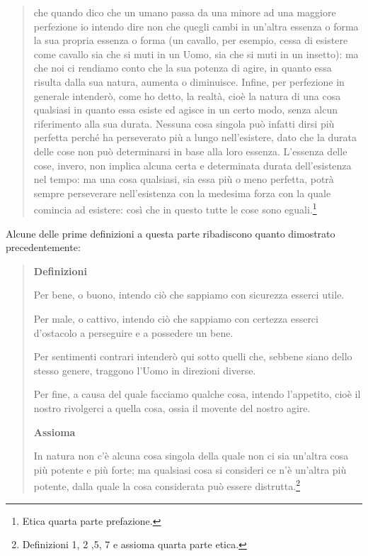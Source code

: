 \begin{quotation}
	che quando dico che un umano passa da una minore ad una maggiore perfezione io intendo dire non che quegli cambi in un’altra essenza o forma la sua propria essenza o forma
	(un cavallo, per esempio, cessa di esistere come cavallo sia che si muti in un Uomo, sia che
	si muti in un insetto): ma che noi ci rendiamo conto che la sua potenza di agire, in quanto
	essa risulta dalla sua natura, aumenta o diminuisce. Infine, per perfezione in generale intenderò, come ho detto, la realtà, cioè la natura di una cosa qualsiasi in quanto essa esiste
	ed agisce in un certo modo, senza alcun riferimento alla sua durata. Nessuna cosa singola
	può infatti dirsi più perfetta perché ha perseverato più a lungo nell’esistere, dato che la durata delle cose non può determinarsi in base alla loro essenza. L’essenza delle cose, invero,
	non implica alcuna certa e determinata durata dell’esistenza nel tempo: ma una cosa qualsiasi, sia essa più o meno perfetta, potrà sempre perseverare nell’esistenza con la medesima forza con la quale comincia ad esistere: così che in questo tutte le cose sono eguali.\footnote{Etica quarta parte prefazione.}
\end{quotation}

Alcune delle prime definizioni a questa parte ribadiscono quanto dimostrato precedentemente:
\begin{quotation}
	
		\begin{center}
		\textbf{Definizioni}	
	\end{center}
	
	\small Per bene, o buono, intendo ciò che sappiamo con sicurezza esserci utile.
	
	Per male, o cattivo, intendo ciò che sappiamo con certezza esserci d’ostacolo a perseguire e a possedere un bene.
	
	Per sentimenti contrari intenderò qui sotto quelli che, sebbene siano dello stesso genere, traggono l’Uomo in direzioni diverse.
	
	Per fine, a causa del quale facciamo qualche cosa, intendo l’appetito, cioè il nostro rivolgerci a quella cosa, ossia il movente del nostro agire.
	
		\begin{center}
		\normalsize \textbf{Assioma}	
	\end{center}
	
	\small In natura non c’è alcuna cosa singola della quale non ci sia un’altra cosa più potente e
	più forte; ma qualsiasi cosa si consideri ce n’è un’altra più potente, dalla quale la cosa considerata può essere distrutta.\footnote{Definizioni 1, 2 ,5, 7 e assioma quarta parte etica.}
\end{quotation}

